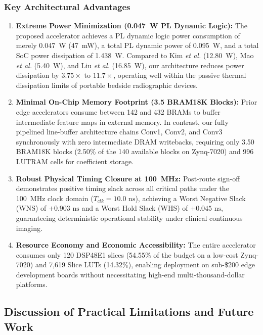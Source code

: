 \documentclass[conference]{IEEEtran}
\begin{document}
\subsubsection{Key Architectural Advantages}
\begin{enumerate}
    \item \textbf{Extreme Power Minimization (0.047~W PL Dynamic Logic):} The proposed accelerator achieves a PL dynamic logic power consumption of merely 0.047~W (47~mW), a total PL dynamic power of 0.095~W, and a total SoC power dissipation of 1.438~W. Compared to Kim \textit{et al.} \cite{kim2019real} (12.80~W), Mao \textit{et al.} \cite{mao2020fdna} (5.40~W), and Liu \textit{et al.} \cite{liu2024high} (16.85~W), our architecture reduces power dissipation by $3.75\times$ to $11.7\times$, operating well within the passive thermal dissipation limits of portable bedside radiographic devices.
    \item \textbf{Minimal On-Chip Memory Footprint (3.5 BRAM18K Blocks):} Prior edge accelerators consume between 142 and 432 BRAMs to buffer intermediate feature maps in external memory. In contrast, our fully pipelined line-buffer architecture chains Conv1, Conv2, and Conv3 synchronously with zero intermediate DRAM writebacks, requiring only 3.50 BRAM18K blocks (2.50\% of the 140 available blocks on Zynq-7020) and 996 LUTRAM cells for coefficient storage.
    \item \textbf{Robust Physical Timing Closure at 100~MHz:} Post-route sign-off demonstrates positive timing slack across all critical paths under the 100~MHz clock domain ($T_{clk} = 10.0\text{ ns}$), achieving a Worst Negative Slack (WNS) of $+0.903\text{ ns}$ and a Worst Hold Slack (WHS) of $+0.045\text{ ns}$, guaranteeing deterministic operational stability under clinical continuous imaging.
    \item \textbf{Resource Economy and Economic Accessibility:} The entire accelerator consumes only 120 DSP48E1 slices (54.55\% of the budget on a low-cost Zynq-7020) and 7,619 Slice LUTs (14.32\%), enabling deployment on sub-\$200 edge development boards without necessitating high-end multi-thousand-dollar platforms.
\end{enumerate}

\subsection{Discussion of Practical Limitations and Future Work}
\label{sec:limitations}
\end{document}
